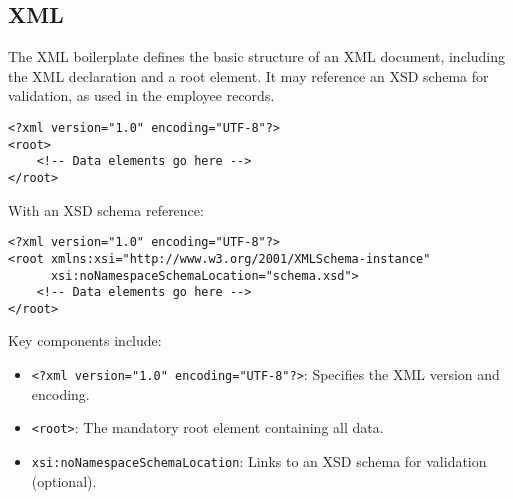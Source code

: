 \begin{description}
    \subsection{XML }
    The XML boilerplate defines the basic structure of an XML document, including the XML declaration and a root element. It may reference an XSD schema for validation, as used in the employee records.
    \lstset{language=XML}
    \begin{lstlisting}
<?xml version="1.0" encoding="UTF-8"?>
<root>
    <!-- Data elements go here -->
</root>
    \end{lstlisting}
    With an XSD schema reference:
    \lstset{language=XML}
    \begin{lstlisting}
<?xml version="1.0" encoding="UTF-8"?>
<root xmlns:xsi="http://www.w3.org/2001/XMLSchema-instance"
      xsi:noNamespaceSchemaLocation="schema.xsd">
    <!-- Data elements go here -->
</root>
    \end{lstlisting}
    Key components include:
    \begin{itemize}
        \item \texttt{<?xml version="1.0" encoding="UTF-8"?>}: Specifies the XML version and encoding.
        \item \texttt{<root>}: The mandatory root element containing all data.
        \item \texttt{xsi:noNamespaceSchemaLocation}: Links to an XSD schema for validation (optional).
    \end{itemize}
\end{description}